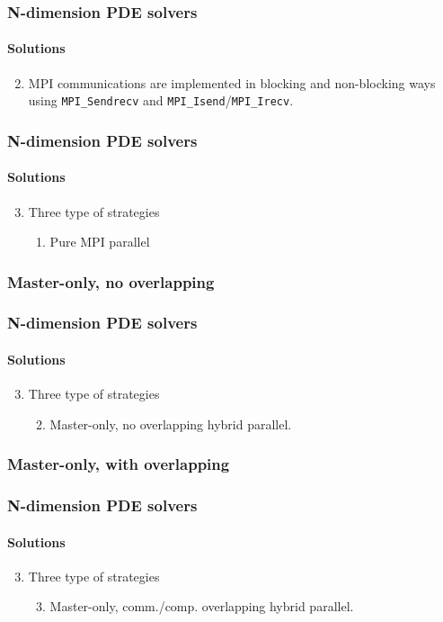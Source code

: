 \begin{frame}
  \frametitle{N-dimension PDE solvers}
  \framesubtitle{Solutions}
  \begin{enumerate}
    \setcounter{enumi}{1}
    \item MPI communications are implemented in blocking and non-blocking ways using \texttt{MPI\_Sendrecv} and \texttt{MPI\_Isend}/\texttt{MPI\_Irecv}.
  \end{enumerate}
\end{frame}


\begin{frame}
  \frametitle{N-dimension PDE solvers}
  \framesubtitle{Solutions}
  \begin{enumerate}
    \setcounter{enumi}{2}
    \item Three type of strategies
    \begin{enumerate}
      \item Pure MPI parallel
    \end{enumerate}
  \end{enumerate}
\end{frame}


\subsubsection{Master-only, no overlapping}
\begin{frame}
  \frametitle{N-dimension PDE solvers}
  \framesubtitle{Solutions}
  \begin{enumerate}
    \setcounter{enumi}{2}
    \item Three type of strategies
    \begin{enumerate}
      \setcounter{enumi}{1}
      \item Master-only, no overlapping hybrid parallel.
    \end{enumerate}
  \end{enumerate}
\end{frame}


\subsubsection{Master-only, with overlapping}
\begin{frame}
  \frametitle{N-dimension PDE solvers}
  \framesubtitle{Solutions}
  \begin{enumerate}
    \setcounter{enumi}{2}
    \item Three type of strategies
    \begin{enumerate}
      \setcounter{enumi}{2}
      \item Master-only, comm./comp. overlapping hybrid parallel.
    \end{enumerate}
  \end{enumerate}
\end{frame}


